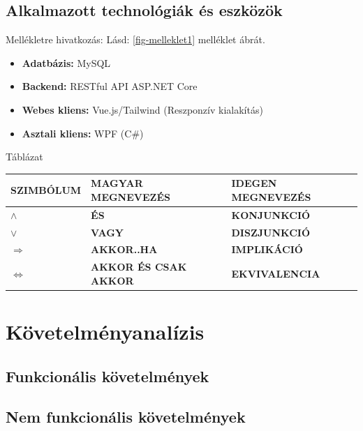 \documentclass[colorlinks]{thesis-kando}
\theoremstyle{definition}
\theoremstyle{remark}
\begin{document}
\section{Alkalmazott technológiák és eszközök}
Mellékletre hivatkozás:
\newline
 Lásd: \ref{fig-melleklet1} melléklet ábrát. 
\begin{itemize}
	\item \textbf{Adatbázis:} MySQL
	\item \textbf{Backend:} RESTful API ASP.NET Core 
	\item \textbf{Webes kliens:} Vue.js/Tailwind (Reszponzív kialakítás)
	\item \textbf{Asztali kliens:} WPF (C\#)
\end{itemize}
\newline
Táblázat
\newline
\begin{table}[ht]
	\centering
	\begin{tabular}{lll}
		\hline
		\multicolumn{1}{|l|}{\textbf{SZIMBÓLUM}} & \multicolumn{1}{l|}{\textbf{MAGYAR MEGNEVEZÉS}} & \multicolumn{1}{l|}{\textbf{IDEGEN MEGNEVEZÉS}} \\ \hline
		\multicolumn{1}{|l|}{\boldmath$\land$} & \multicolumn{1}{l|}{\textbf{ÉS}} & \multicolumn{1}{l|}{\textbf{KONJUNKCIÓ}} \\ \hline
		\multicolumn{1}{|l|}{\boldmath$\lor$} & \multicolumn{1}{l|}{\textbf{VAGY}} & \multicolumn{1}{l|}{\textbf{DISZJUNKCIÓ}} \\ \hline
		\multicolumn{1}{|l|}{\boldmath$\Rightarrow$} & \multicolumn{1}{l|}{\textbf{AKKOR..HA}} & \multicolumn{1}{l|}{\textbf{IMPLIKÁCIÓ}} \\ \hline
		\multicolumn{1}{|l|}{\boldmath$\Leftrightarrow$} & \multicolumn{1}{l|}{\textbf{AKKOR ÉS CSAK AKKOR}} & \multicolumn{1}{l|}{\textbf{EKVIVALENCIA}} \\ \hline
	\end{tabular}
\end{table}
\chapter{Követelményanalízis}
\section{Funkcionális követelmények}
\section{Nem funkcionális követelmények}
\end{document}
